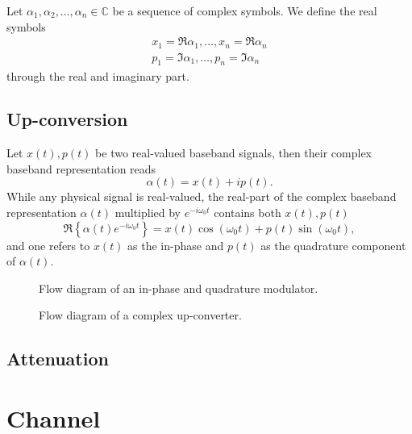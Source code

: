 
Let $\alpha_1,\alpha_2,\dots,\alpha_n\in\mathbb{C}$ be a sequence of complex symbols.
We define the real symbols
\begin{align}
	x_1=\Re{\alpha_1},
	\dots,
	x_n=\Re{\alpha_n}
	\\
	p_1=\Im{\alpha_1},
	\dots,
	p_n=\Im{\alpha_n}
\end{align}
through the real and imaginary part.

\subsection{Up-conversion}

Let $x(t),p(t)$ be two real-valued baseband signals, then their complex baseband representation reads
\begin{equation}
	\alpha(t)
	=
	x(t)
	+
	ip(t)
	.
\end{equation}
While any physical signal is real-valued, the real-part of the complex baseband representation $\alpha(t)$ multiplied by $e^{-i\omega_0t}$ contains both $x(t),p(t)$~\cite[p.~25]{Madhow2008}
\begin{equation}
	\Re\left\{
		\alpha(t)
		e^{-i\omega_0t}
	\right\}
	=
	x(t)
	\cos(\omega_0t)
	+
	p(t)
	\sin(\omega_0t)
	,
\end{equation}
and one refers to $x(t)$ as the in-phase and $p(t)$ as the quadrature component of $\alpha(t)$.
\begin{figure}[htb]
	\centering
	
	\caption{Flow diagram of an in-phase and quadrature modulator.}
\end{figure}
\begin{figure}[htb]
	\centering
	
	\caption{Flow diagram of a complex up-converter.}
\end{figure}

\subsection{Attenuation}

\section{Channel}


